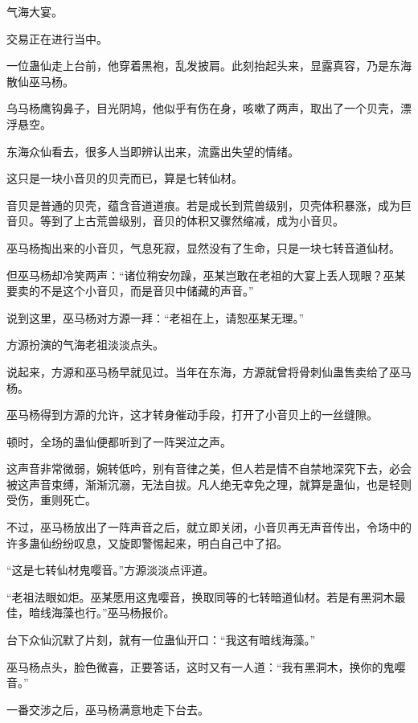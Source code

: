 
\begin{this_body}



气海大宴。

交易正在进行当中。

一位蛊仙走上台前，他穿着黑袍，乱发披肩。此刻抬起头来，显露真容，乃是东海散仙巫马杨。

乌马杨鹰钩鼻子，目光阴鸠，他似乎有伤在身，咳嗽了两声，取出了一个贝壳，漂浮悬空。

东海众仙看去，很多人当即辨认出来，流露出失望的情绪。

这只是一块小音贝的贝壳而已，算是七转仙材。

音贝是普通的贝壳，蕴含音道道痕。若是成长到荒兽级别，贝壳体积暴涨，成为巨音贝。等到了上古荒兽级别，音贝的体积又骤然缩减，成为小音贝。

巫马杨掏出来的小音贝，气息死寂，显然没有了生命，只是一块七转音道仙材。

但巫马杨却冷笑两声：“诸位稍安勿躁，巫某岂敢在老祖的大宴上丢人现眼？巫某要卖的不是这个小音贝，而是音贝中储藏的声音。”

说到这里，巫马杨对方源一拜：“老祖在上，请恕巫某无理。”

方源扮演的气海老祖淡淡点头。

说起来，方源和巫马杨早就见过。当年在东海，方源就曾将骨刺仙蛊售卖给了巫马杨。

巫马杨得到方源的允许，这才转身催动手段，打开了小音贝上的一丝缝隙。

顿时，全场的蛊仙便都听到了一阵哭泣之声。

这声音非常微弱，婉转低吟，别有音律之美，但人若是情不自禁地深究下去，必会被这声音束缚，渐渐沉溺，无法自拔。凡人绝无幸免之理，就算是蛊仙，也是轻则受伤，重则死亡。

不过，巫马杨放出了一阵声音之后，就立即关闭，小音贝再无声音传出，令场中的许多蛊仙纷纷叹息，又旋即警惕起来，明白自己中了招。

“这是七转仙材鬼嘤音。”方源淡淡点评道。

“老祖法眼如炬。巫某愿用这鬼嘤音，换取同等的七转暗道仙材。若是有黑洞木最佳，暗线海藻也行。”巫马杨报价。

台下众仙沉默了片刻，就有一位蛊仙开口：“我这有暗线海藻。”

巫马杨点头，脸色微喜，正要答话，这时又有一人道：“我有黑洞木，换你的鬼嘤音。”

一番交涉之后，巫马杨满意地走下台去。


\end{this_body}
